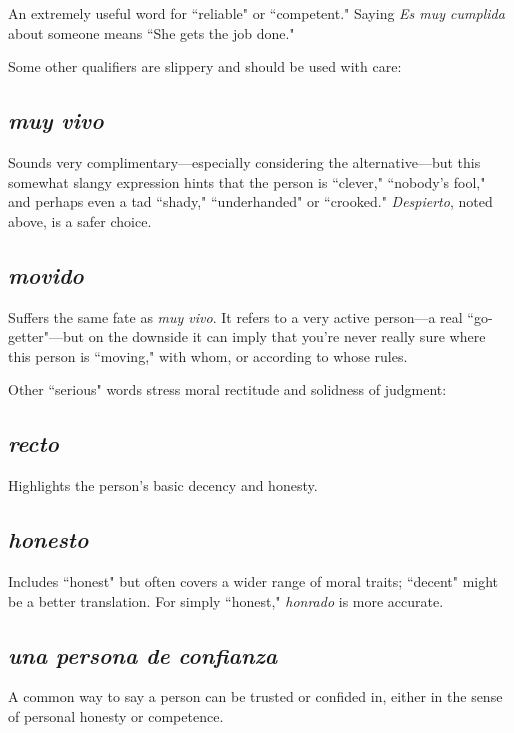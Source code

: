 An extremely useful word for ``reliable" or ``competent." Saying \emph{Es muy cumplida} about someone means ``She gets the job done."

\bsk

Some other qualifiers are slippery and should be used with care:

\subsection{\emph{muy vivo}}

Sounds very complimentary---especially considering the alternative---but this somewhat slangy expression hints that
the person is ``clever," ``nobody's fool," and perhaps even a tad ``shady,"
``underhanded" or ``crooked." \emph{Despierto}, noted above, is a safer choice.

\subsection{\emph{movido}}

Suffers the same fate as \emph{muy vivo}. It refers to a very
active person---a real ``go-getter"---but on the downside it can imply
that you're never really sure where this person is ``moving," with
whom, or according to whose rules.

\bsk

Other ``serious" words stress moral rectitude and solidness of
judgment:

\subsection{\emph{recto}}

Highlights the person's basic decency and honesty.

\subsection{\emph{honesto}}

Includes ``honest" but often covers a wider range
of moral traits; ``decent" might be a better translation. For simply
``honest," \emph{honrado} is more accurate.

\subsection{\emph{una persona de confianza}}

A common way to say a person can be trusted or confided in, either in the sense of personal honesty or competence.

